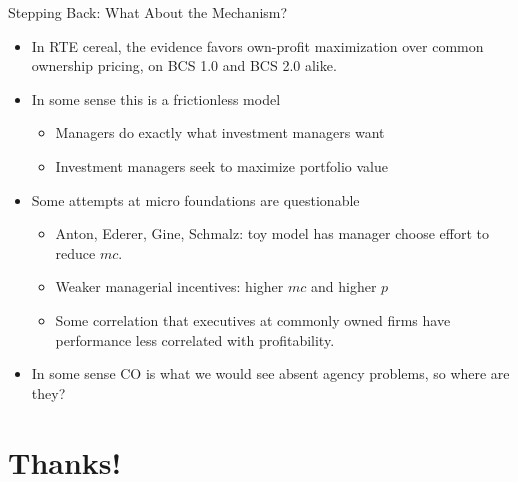 \documentclass[aspectratio=169,10pt]{beamer}
\begin{document}
\begin{frame}[plain]{Stepping Back: What About the Mechanism?}
\begin{itemize}
\item In RTE cereal, the evidence favors own-profit maximization over common ownership pricing, on BCS 1.0 and BCS 2.0 alike.
\item In some sense this is a \alert{frictionless} model
\begin{itemize}
  \item Managers do exactly what investment managers want
  \item Investment managers seek to maximize \alert{portfolio value}
\end{itemize}
\item Some attempts at micro foundations are questionable
\begin{itemize}
  \item Anton, Ederer, Gine, Schmalz: toy model has manager choose effort to reduce $mc$.
  \item Weaker managerial incentives: higher $mc$ and higher $p$
  \item Some correlation that executives at commonly owned firms have performance less correlated with profitability.
\end{itemize}
\item In some sense CO is what we would see absent agency problems, so where are they?
\end{itemize}
\end{frame}


\section{Thanks!}
\end{document}
